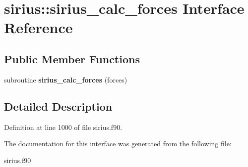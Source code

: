 \hypertarget{interfacesirius_1_1sirius__calc__forces}{}\section{sirius\+:\+:sirius\+\_\+calc\+\_\+forces Interface Reference}
\label{interfacesirius_1_1sirius__calc__forces}
\subsection*{Public Member Functions}
\begin{DoxyCompactItemize}
\item 
\hypertarget{interfacesirius_1_1sirius__calc__forces_a64a8a8bc3fdc27a518ffe1d85308acfb}{}subroutine {\bfseries sirius\+\_\+calc\+\_\+forces} (forces)\label{interfacesirius_1_1sirius__calc__forces_a64a8a8bc3fdc27a518ffe1d85308acfb}

\end{DoxyCompactItemize}


\subsection{Detailed Description}


Definition at line 1000 of file sirius.\+f90.



The documentation for this interface was generated from the following file\+:\begin{DoxyCompactItemize}
\item 
sirius.\+f90\end{DoxyCompactItemize}
